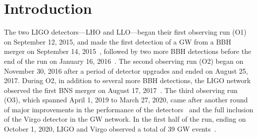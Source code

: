 \section{Introduction}

The two \ac{LIGO} detectors---\ac{LHO} and \ac{LLO}---began their first observing run (O1) on September 12, 2015, and made the first detection of a \ac{GW} from a \ac{BBH} merger on September 14, 2015~\cite{gw150914}, followed by two more \ac{BBH} detections before the end of the run on January 16, 2016~\cite{gwtc1}.
The second observing run (O2) began on November 30, 2016 after a period of detector upgrades and ended on August 25, 2017.
During O2, in addition to several more \ac{BBH} detections, the \ac{LIGO} network observed the first \ac{BNS} merger on August 17, 2017~\cite{gw170817}.
The third observing run (O3), which spanned April 1, 2019 to March 27, 2020, came after another round of major improvements in the performance of the detectors~\cite{Buikema_2020} and the full inclusion of the Virgo detector in the GW network.
In the first half of the run, ending on October 1, 2020, \ac{LIGO} and Virgo observed a total of 39 GW events~\cite{gwtc2}.
